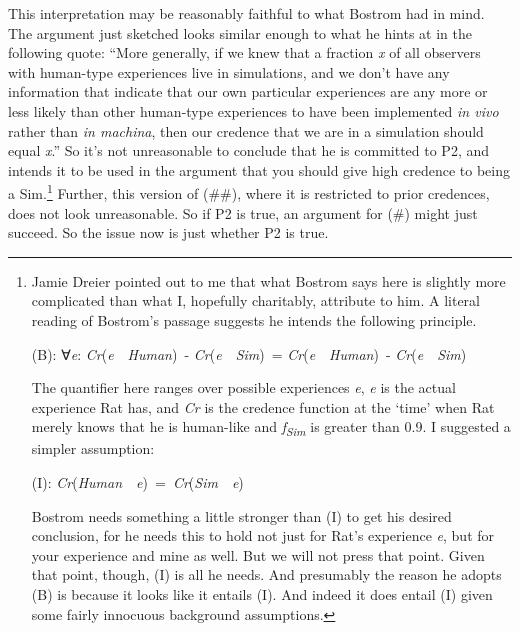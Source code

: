\documentclass[
  10pt,
  letterpaper,
  DIV=11,
  numbers=noendperiod,
  twoside]{scrartcl}
\begin{document}
This interpretation may be reasonably faithful to what Bostrom had in
mind. The argument just sketched looks similar enough to what he hints
at in the following quote: ``More generally, if we knew that a fraction
\emph{x} of all observers with human-type experiences live in
simulations, and we don't have any information that indicate that our
own particular experiences are any more or less likely than other
human-type experiences to have been implemented \emph{in vivo} rather
than \emph{in machina}, then our credence that we are in a simulation
should equal \emph{x}.'' So it's not unreasonable to conclude that he is
committed to P2, and intends it to be used in the argument that you
should give high credence to being a Sim.\footnote{Jamie Dreier pointed
  out to me that what Bostrom says here is slightly more complicated
  than what I, hopefully charitably, attribute to him. A literal reading
  of Bostrom's passage suggests he intends the following principle.

  (B): ∀\emph{e}: \emph{Cr}(\emph{e}~\textbar~\emph{Human})~-
  \emph{Cr}(\emph{e}~\textbar~\emph{Sim})~=
  \emph{Cr}(\emph{e}~\textbar~\emph{Human})~-
  \emph{Cr}(\emph{e}~\textbar~\emph{Sim})

  The quantifier here ranges over possible experiences \emph{e},
  \emph{e} is the actual experience Rat has, and \emph{Cr} is the
  credence function at the `time' when Rat merely knows that he is
  human-like and \emph{f\textsubscript{Sim}} is greater than 0.9. I
  suggested a simpler assumption:

  (I):
  \emph{Cr}(\emph{Human}~\textbar~\emph{e})~=~\emph{Cr}(\emph{Sim}~\textbar~\emph{e})

  Bostrom needs something a little stronger than (I) to get his desired
  conclusion, for he needs this to hold not just for Rat's experience
  \emph{e}, but for your experience and mine as well. But we will not
  press that point. Given that point, though, (I) is all he needs. And
  presumably the reason he adopts (B) is because it looks like it
  entails (I). And indeed it does entail (I) given some fairly innocuous
  background assumptions.} Further, this version of (\#\#), where it is
restricted to prior credences, does not look unreasonable. So if P2 is
true, an argument for (\#) might just succeed. So the issue now is just
whether P2 is true.
\end{document}
